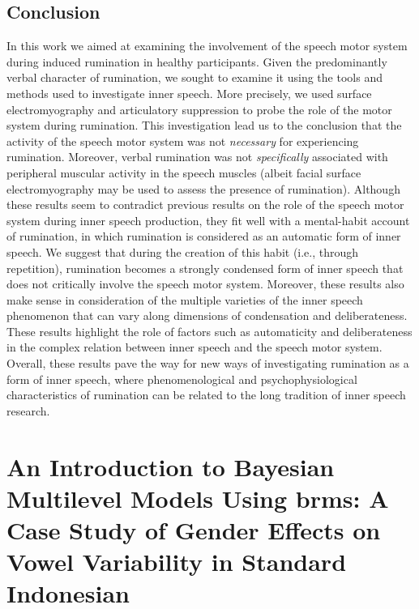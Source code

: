 \documentclass[a4paper,12pt,twoside,onecolumn,openright,final,oldfontcommands]{memoir}
\begin{document}
\hypertarget{conclusion}{%
\section{Conclusion}\label{conclusion}}

In this work we aimed at examining the involvement of the speech motor system during induced rumination in healthy participants. Given the predominantly verbal character of rumination, we sought to examine it using the tools and methods used to investigate inner speech. More precisely, we used surface electromyography and articulatory suppression to probe the role of the motor system during rumination. This investigation lead us to the conclusion that the activity of the speech motor system was not \emph{necessary} for experiencing rumination. Moreover, verbal rumination was not \emph{specifically} associated with peripheral muscular activity in the speech muscles (albeit facial surface electromyography may be used to assess the presence of rumination). Although these results seem to contradict previous results on the role of the speech motor system during inner speech production, they fit well with a mental-habit account of rumination, in which rumination is considered as an automatic form of inner speech. We suggest that during the creation of this habit (i.e., through repetition), rumination becomes a strongly condensed form of inner speech that does not critically involve the speech motor system. Moreover, these results also make sense in consideration of the multiple varieties of the inner speech phenomenon that can vary along dimensions of condensation and deliberateness. These results highlight the role of factors such as automaticity and deliberateness in the complex relation between inner speech and the speech motor system. Overall, these results pave the way for new ways of investigating rumination as a form of inner speech, where phenomenological and psychophysiological characteristics of rumination can be related to the long tradition of inner speech research.

\hypertarget{appendix-appendix}{%
\appendix {}}


\hypertarget{appendix-brms}{%
\chapter{An Introduction to Bayesian Multilevel Models Using brms: A Case Study of Gender Effects on Vowel Variability in Standard Indonesian}\label{appendix-brms}}
\end{document}
